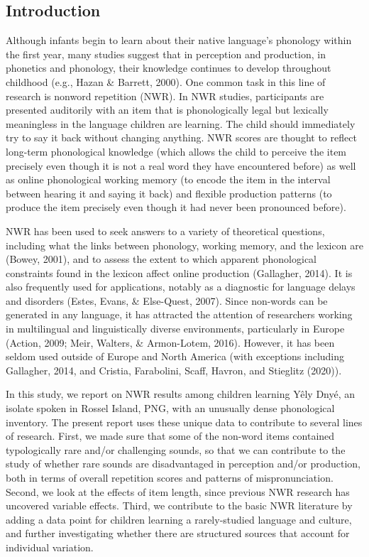 \documentclass[english,,man,floatsintext]{apa6}
\begin{document}
\subsection{Introduction}\label{introduction}

Although infants begin to learn about their native language's phonology
within the first year, many studies suggest that in perception and
production, in phonetics and phonology, their knowledge continues to
develop throughout childhood (e.g., Hazan \& Barrett, 2000). One common
task in this line of research is nonword repetition (NWR). In NWR
studies, participants are presented auditorily with an item that is
phonologically legal but lexically meaningless in the language children
are learning. The child should immediately try to say it back without
changing anything. NWR scores are thought to reflect long-term
phonological knowledge (which allows the child to perceive the item
precisely even though it is not a real word they have encountered
before) as well as online phonological working memory (to encode the
item in the interval between hearing it and saying it back) and flexible
production patterns (to produce the item precisely even though it had
never been pronounced before).

NWR has been used to seek answers to a variety of theoretical questions,
including what the links between phonology, working memory, and the
lexicon are (Bowey, 2001), and to assess the extent to which apparent
phonological constraints found in the lexicon affect online production
(Gallagher, 2014). It is also frequently used for applications, notably
as a diagnostic for language delays and disorders (Estes, Evans, \&
Else-Quest, 2007). Since non-words can be generated in any language, it
has attracted the attention of researchers working in multilingual and
linguistically diverse environments, particularly in Europe (Action,
2009; Meir, Walters, \& Armon-Lotem, 2016). However, it has been seldom
used outside of Europe and North America (with exceptions including
Gallagher, 2014, and Cristia, Farabolini, Scaff, Havron, and Stieglitz
(2020)).

In this study, we report on NWR results among children learning Yêly
Dnyé, an isolate spoken in Rossel Island, PNG, with an unusually dense
phonological inventory. The present report uses these unique data to
contribute to several lines of research. First, we made sure that some
of the non-word items contained typologically rare and/or challenging
sounds, so that we can contribute to the study of whether rare sounds
are disadvantaged in perception and/or production, both in terms of
overall repetition scores and patterns of mispronunciation. Second, we
look at the effects of item length, since previous NWR research has
uncovered variable effects. Third, we contribute to the basic NWR
literature by adding a data point for children learning a rarely-studied
language and culture, and further investigating whether there are
structured sources that account for individual variation.
\end{document}
